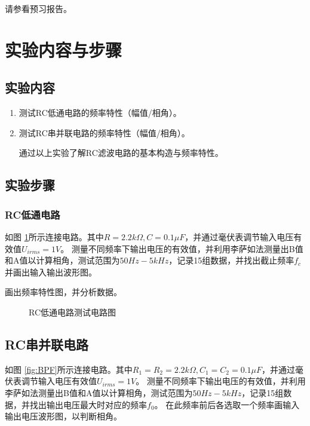 \documentclass[a4paper,11pt,UTF8]{ctexart}
\begin{document}
请参看预习报告。

\section{实验内容与步骤}
\subsection{实验内容}
\begin{enumerate}
  \item 测试RC低通电路的频率特性（幅值/相角）。
  \item 测试RC串并联电路的频率特性（幅值/相角）。

  通过以上实验了解RC滤波电路的基本构造与频率特性。
\end{enumerate}
\subsection{实验步骤}
\subsubsection{RC低通电路}
如图 \ref{fig:LPF}所示连接电路。其中$R=2.2k\Omega,C=0.1\mu F$，并通过毫伏表调节输入电压有效值$U_{irms}=1V$。
测量不同频率下输出电压的有效值，并利用李萨如法测量出B值和A值以计算相角，测试范围为$50Hz-5kHz$，记录15组数据，并找出截止频率$f_c$并画出输入输出波形图。

画出频率特性图，并分析数据。

\begin{figure}[htbp]
  \centering
  \caption{RC低通电路测试电路图}
  \label{fig:LPF}
  \end{figure}

\subsection{RC串并联电路}
如图 \ref{fig:BPF}所示连接电路。其中$R_1=R_2=2.2k\Omega,C_1=C_2=0.1\mu F$，并通过毫伏表调节输入电压有效值$U_{irms}=1V$。
测量不同频率下输出电压的有效值，并利用李萨如法测量出B值和A值以计算相角，测试范围为$50Hz-5kHz$，记录15组数据，并找出输出电压最大时对应的频率$f_0$。
在此频率前后各选取一个频率画输入输出电压波形图，以判断相角。
\end{document}
